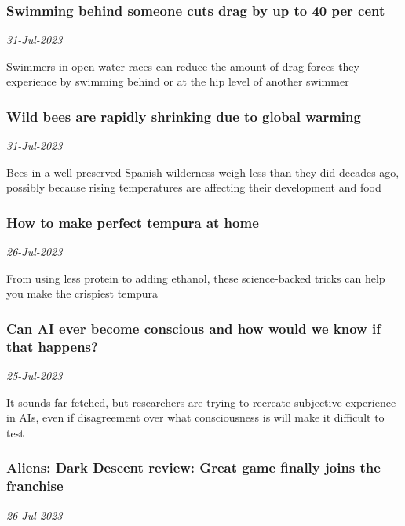 \subsubsection{Swimming behind someone cuts drag by up to 40 per cent \href{https://www.newscientist.com/article/2385153-swimming-behind-someone-cuts-drag-by-up-to-40-per-cent/?utm_campaign=RSS%7CNSNS&utm_source=NSNS&utm_medium=RSS&utm_content=home}{}}
\textit{31-Jul-2023}

Swimmers in open water races can reduce the amount of drag forces they experience by swimming behind or at the hip level of another swimmer
\subsubsection{Wild bees are rapidly shrinking due to global warming \href{https://www.newscientist.com/article/2384886-wild-bees-are-rapidly-shrinking-due-to-global-warming/?utm_campaign=RSS%7CNSNS&utm_source=NSNS&utm_medium=RSS&utm_content=home}{\ding{225}}}
\textit{31-Jul-2023}

Bees in a well-preserved Spanish wilderness weigh less than they did decades ago, possibly because rising temperatures are affecting their development and food
\subsubsection{How to make perfect tempura at home \href{https://www.newscientist.com/article/mg25934491-600-how-to-make-perfect-tempura-at-home/?utm_campaign=RSS%7CNSNS&utm_source=NSNS&utm_medium=RSS&utm_content=home}{}}
\textit{26-Jul-2023}

From using less protein to adding ethanol, these science-backed tricks can help you make the crispiest tempura
\subsubsection{Can AI ever become conscious and how would we know if that happens? \href{https://www.newscientist.com/article/2384077-can-ai-ever-become-conscious-and-how-would-we-know-if-that-happens/?utm_campaign=RSS%7CNSNS&utm_source=NSNS&utm_medium=RSS&utm_content=home}{\ding{225}}}
\textit{25-Jul-2023}

It sounds far-fetched, but researchers are trying to recreate subjective experience in AIs, even if disagreement over what consciousness is will make it difficult to test
\subsubsection{Aliens: Dark Descent review: Great game finally joins the franchise \href{https://www.newscientist.com/article/mg25934491-200-aliens-dark-descent-review-great-game-finally-joins-the-franchise/?utm_campaign=RSS%7CNSNS&utm_source=NSNS&utm_medium=RSS&utm_content=home}{}}
\textit{26-Jul-2023}

